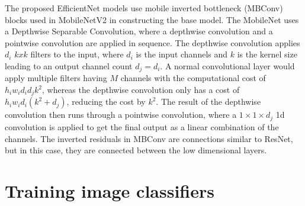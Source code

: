 The proposed EfficientNet models use mobile inverted bottleneck (MBConv) blocks used in MobileNetV2 \citep{mobileNetv2} in constructing the base model. The MobileNet uses a Depthwise Separable Convolution, where a depthwise convolution and a pointwise convolution are applied in sequence. The depthwise convolution applies ${d_i}$ ${k x k}$ filters to the input, where ${d_i}$ is the input channels and ${k}$ is the kernel size leading to an output channel count ${d_j = d_i}$. A normal convolutional layer would apply multiple filters having ${M}$ channels with the computational cost of ${h_i w_i d_i d_j k^2}$, whereas the depthwise convolution only has a cost of ${h_i w_i d_i (k^2 + d_j)}$, reducing the cost by ${k^2}$. The result of the depthwise convolution then runs through a pointwise convolution, where a ${1 \times 1 \times d_j}$ 1d convolution is applied to get the final output as a linear combination of the channels. The inverted residuals in MBConv are connections similar to ResNet, but in this case, they are connected between the low dimensional layers.

\section{Training image classifiers}
